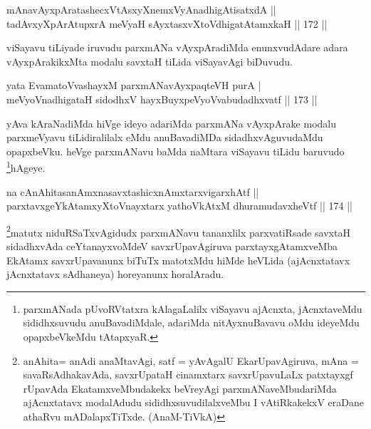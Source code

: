 \begin{shl}
mAnavAyxpAratashecxVtAsxyXnemxVyAnadhigAtisatxdA ||  \\
tadAvxyXpArAtupxrA meVyaH sAyxtasxvXtoVdhigatAtamxkaH \hfill||  172 ||  
\end{shl}

\begin{artha}
viSayavu tiLiyade iruvudu parxmANa vAyxpAradiMda enunxvudAdare adara vAyxpArakikxMta modalu savxtaH tiLida viSayavAgi biDuvudu.
\end{artha}

\begin{shl}
yata EvamatoV\s vashayxM parxmANavAyxpaqteVH purA | \\
meVyoV\s nadhigataH sidodhxV hayxBuyxpeVyoV\s vabudadhxvatf \hfill||  173 ||  
\end{shl}

\begin{artha}
yAva kAraNadiMda hiVge ideyo adariMda parxmANa vAyxpArake modalu parxmeVyavu tiLidiralilalx eMdu anuBavadiMDa sidadhxvAguvudaMdu opapxbeVku. heVge parxmANavu baMda naMtara viSayavu tiLidu baruvudo \footnote{parxmANada pUvoRVtatxra kAlagaLalilx viSayavu ajAcnxta, jAcnxtaveMdu sididhxsuvudu anuBavadiMdale, adariMda nitAyxnuBavavu oMdu ideyeMdu opapxbeVkeMdu tAtapxyaR.}hAgeye.
\end{artha}


\begin{shl}
na cAnAhitasanAmxnasavxtashicxnAmxtarxvigarxhAtf ||  \\
parxtavxgeYkAtamxyXtoV\s nayxtarx yathoVkAtxM dhuramudavxheVtf \hfill||  174 ||  
\end{shl}

\begin{artha}
\footnote{anAhita= anAdi anaMtavAgi, satf = yAvAgalU EkarUpavAgiruva, mAna = savaRsAdhakavAda, savxrUpataH cinamxtarx savxrUpavuLaLx patxtayxgf rUpavAda EkatamxveMbudakekx beVreyAgi parxmANaveMbudariMda ajAcnxtatavx modalAdudu sididhxsuvudilalxveMbu I vAtiRkakekxV eraDane athaRvu mADalapxTiTxde. (AnaM-TiVkA)}matutx niduRSaTxvAgidudx parxmANavu tananxlilx parxvatiRsade savxtaH sidadhxvAda ceYtanayxvoMdeV savxrUpavAgiruva parxtayxgAtamxveMba EkAtamx savxrUpavanunx biTuTx matotxMdu hiMde heVLida (ajAcnxtatavx jAcnxtatavx sAdhaneya) horeyanunx horalAradu.
\end{artha}

